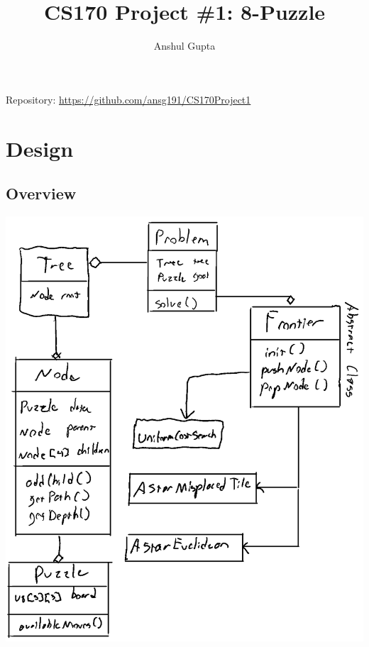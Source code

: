 \documentclass[12pt, english]{article}
\author{Anshul Gupta}
\title{CS170 Project \#1: 8-Puzzle}
\begin{document}
    \maketitle

    \begin{center}
        Repository: \url{https://github.com/ansg191/CS170Project1}
    \end{center}

    \noindent\makebox[\linewidth]{\rule{\paperwidth}{0.4pt}}

    \section{Design}

    \subsection{Overview}

    \begin{center}
        \includegraphics[scale=0.35]{frontier.png}
    \end{center}
\end{document}
